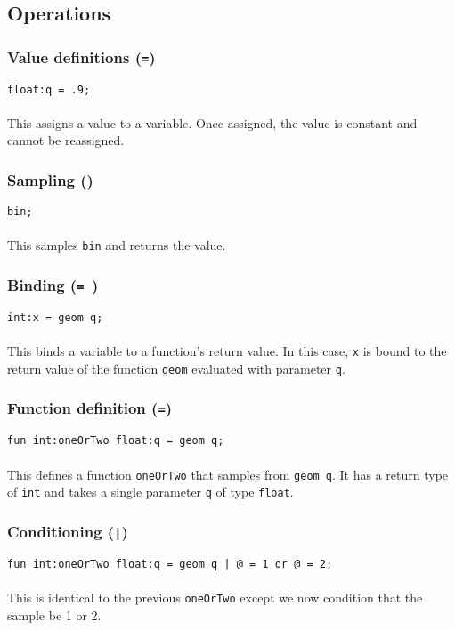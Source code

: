 \subsection{Operations}

\subsubsection{Value definitions (\texttt{=})}
\texttt{float:q = .9;}\\
\\
This assigns a value to a variable. Once assigned, the value is constant and cannot be reassigned.

\subsubsection{Sampling (\texttt{\midtilde})}
\texttt{\midtilde bin;}\\
\\
This samples \texttt{bin} and returns the value.

\subsubsection{Binding (\texttt{= \midtilde })}
\texttt{int:x = \midtilde geom q;}\\
\\
This binds a variable to a function's return value. In this case, \texttt{x} is bound to the return value of the function \texttt{geom} evaluated with parameter \texttt{q}.

\subsubsection{Function definition (\texttt{=})}
\texttt{fun int:oneOrTwo float:q = geom q;}\\
\\
This defines a function \texttt{oneOrTwo} that samples from \texttt{geom q}. It has a return type of \texttt{int} and takes a single parameter \texttt{q} of type \texttt{float}. 

\subsubsection{Conditioning (\texttt{|})}
\texttt{fun int:oneOrTwo float:q = geom q | @ = 1 or @ = 2;}\\
\\
This is identical to the previous \texttt{oneOrTwo} except we now condition that the sample be 1 or 2.

